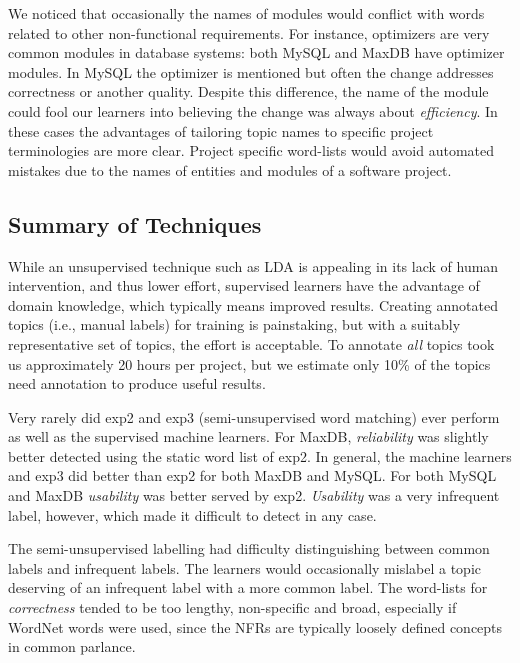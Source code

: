\documentclass[smallextended]{svjour3}       %
\begin{document}
We noticed that occasionally the names of modules would conflict with words related to other non-functional requirements. 
For instance, optimizers are very common modules in database systems: both MySQL and MaxDB have optimizer modules. 
In MySQL the optimizer is mentioned but often the change addresses  correctness or another quality. 
Despite this difference, the name of the module could fool our learners into believing the change was always about \emph{efficiency}. 
In these cases the advantages of tailoring topic names to specific project terminologies are more clear. 
Project specific word-lists would avoid automated mistakes due to the names of entities and modules of a software project.

\subsection{Summary of Techniques}
While an unsupervised technique such as LDA is appealing in its lack of human intervention, and thus lower effort, 
supervised learners have the advantage of domain knowledge, which typically means improved results. 
Creating annotated topics (i.e., manual labels) for training is painstaking, but with a suitably representative set of topics, the effort is acceptable. To
annotate \emph{all} topics took us approximately 20 hours per project, but we estimate only 10\% of the topics need annotation to produce useful results.

Very rarely did \textsf{exp2} and \textsf{exp3} (semi-unsupervised word matching) ever perform as well as the supervised machine learners. 
For MaxDB, \textit{reliability} was slightly better detected using the static word list of \textsf{exp2}. 
In general, the machine learners and \textsf{exp3} did better than \textsf{exp2} for both MaxDB and MySQL. 
For both MySQL and MaxDB \textit{usability} was better served by \textsf{exp2}. 
\textit{Usability} was a very infrequent label, however, which made it difficult to detect in any case.

The semi-unsupervised labelling had difficulty distinguishing between common labels and infrequent labels. 
The learners would occasionally mislabel a topic deserving of an infrequent label with a more common label.
The word-lists for \emph{correctness} tended to be too lengthy, non-specific and broad, especially if WordNet words were used, since the NFRs are
typically loosely defined concepts in common parlance.
\end{document}
